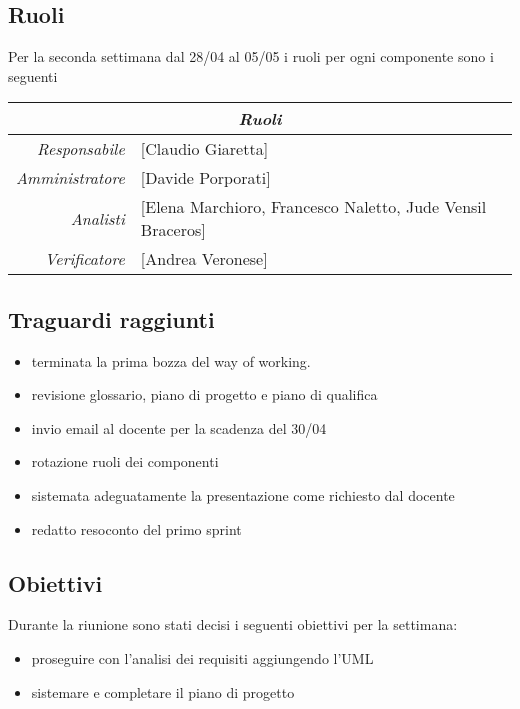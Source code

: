 \documentclass[12pt]{article}
\begin{document}
\subsection{Ruoli}
Per la seconda settimana dal 28/04 al 05/05 i ruoli per ogni componente sono i seguenti
\\
\begin{tabular}{r | l}
    \multicolumn{2}{c}{\textit{Ruoli}}\\
    \hline
        \textit{Responsabile} &
        [Claudio Giaretta]\makecell{}\\
        \textit{Amministratore} &
        [Davide Porporati]\makecell{}\\
        \textit{Analisti} &
        [Elena Marchioro, Francesco Naletto, Jude Vensil Braceros]\makecell{}\\
        \textit{Verificatore} & 
        [Andrea Veronese]\makecell{}\\
\end{tabular}

\subsection{Traguardi raggiunti}
\begin{itemize}
    \item terminata la prima bozza del way of working.
    \item revisione glossario, piano di progetto e piano di qualifica
    \item invio email al docente per la scadenza del 30/04
    \item rotazione ruoli dei componenti
    \item sistemata adeguatamente la presentazione come richiesto dal docente
    \item redatto resoconto del primo sprint
\end{itemize}

\subsection{Obiettivi}
Durante la riunione sono stati decisi i seguenti obiettivi per la settimana:
\begin{itemize}
    \item proseguire con l'analisi dei requisiti aggiungendo l'UML
    \item sistemare e completare il piano di progetto


\end{itemize}
\end{document}

